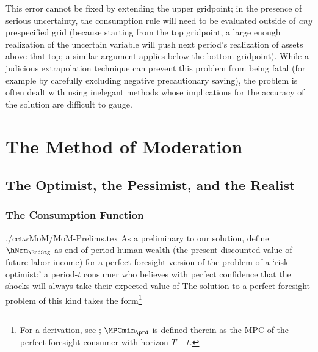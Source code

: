 \documentclass[titlepage, headings=optiontotocandhead]{econark}
\begin{document}
  This error cannot be fixed by extending the upper gridpoint; in the presence of serious uncertainty, the consumption rule will need to be evaluated outside of \textit{any} prespecified grid (because starting from the top gridpoint, a large enough realization of the uncertain variable will push next period's realization of assets above that top; a similar argument applies below the bottom gridpoint).  While a judicious extrapolation technique can prevent this problem from being fatal (for example by carefully excluding negative precautionary saving), the problem is often dealt with using inelegant methods whose implications for the accuracy of the solution are difficult to gauge.



\hypertarget{the-method-of-moderation}{}
\section{The Method of Moderation}

\hypertarget{the-optimist-the-pessimist-and-the-realist}{}
\subsection{The Optimist, the Pessimist, and the Realist}

\hypertarget{the-consumption-function}{}
\subsubsection{The Consumption Function}

\begin{verbatimwrite}{./cctwMoM/MoM-Prelims.tex}
  As a preliminary to our solution, define $\hNrm_{\EndStg}$ as end-of-period human wealth (the present discounted value of future labor income) for a perfect foresight version of the problem of a `risk optimist:' a period-$t$ consumer who believes with perfect confidence that the shocks will always take their expected value of   The solution to a perfect foresight problem of this kind takes the form\footnote{For a derivation, see \cite{BufferStockTheory}; $\MPCmin_{\prd}$ is defined therein as the MPC of the perfect foresight consumer with horizon $T-t$.}
\end{verbatimwrite}
\end{document}

